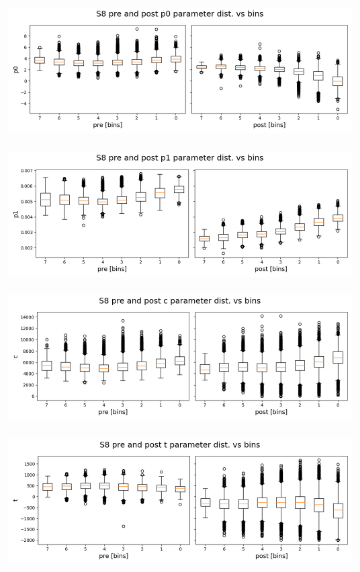 \begin{figure}[H]
    \centering
\begin{subfigure}[b]{0.95\textwidth}
    \centering
    \includegraphics[width=\linewidth]{figures/chapter4/surrogates/p2_box_plot0.png}
  \end{subfigure}
\begin{subfigure}[b]{0.95\textwidth}
    \centering
    \includegraphics[width=\linewidth]{figures/chapter4/surrogates/p2_box_plot1.png}
  \end{subfigure}
\begin{subfigure}[b]{0.95\textwidth}
    \centering
    \includegraphics[width=\linewidth]{figures/chapter4/surrogates/p2_box_plot2.png}
  \end{subfigure}
\begin{subfigure}[b]{0.95\textwidth}
    \centering
    \includegraphics[width=\linewidth]{figures/chapter4/surrogates/p2_box_plot3.png}

\end{subfigure}
\end{figure}
